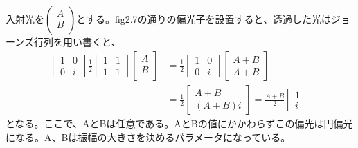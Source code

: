 \documentclass{jsarticle}
\begin{document}
\subsection{}

\subsection{}
入射光を$\left(
    \begin{array}{c}
      A \\
      B \\     
    \end{array}
  \right)$とする。fig2.7の通りの偏光子を設置すると、透過した光はジョーンズ行列を用い書くと、
\begin{align}
\begin{bmatrix}
1 & 0 \\
0 & i
\end{bmatrix}
\frac{1}{2}
\begin{bmatrix}
1 & 1 \\
1 & 1
\end{bmatrix}
\left[
    \begin{array}{c}
      A \\
      B \\     
    \end{array}
  \right]      
&=
\frac{1}{2}
　\begin{bmatrix}
1 & 0 \\
0 & i
　\end{bmatrix}
\begin{bmatrix}
A+B \\
A+B
\end{bmatrix} \\
&=
\frac{1}{2}
　\begin{bmatrix}
A+B \\
(A+B)i
　\end{bmatrix}  
=
\frac{A+B}{2}\begin{bmatrix}
1 \\
i
\end{bmatrix}
\end{align}
となる。ここで、AとBは任意である。AとBの値にかかわらずこの偏光は円偏光になる。A、Bは振幅の大きさを決めるパラメータになっている。
\end{document}
